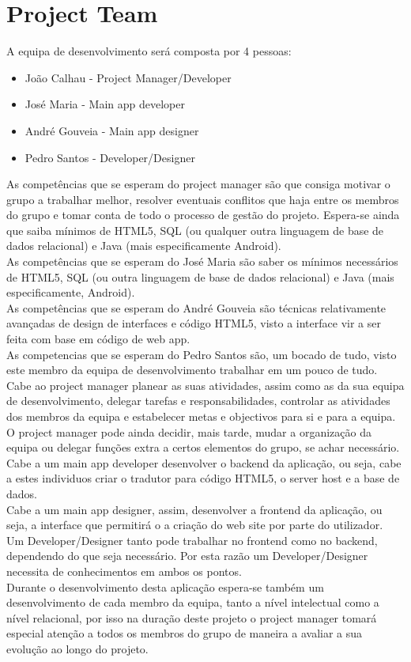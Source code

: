 \documentclass[a4paper]{article}
\begin{document}
\section{Project Team}

A equipa de desenvolvimento será composta por 4 pessoas:
\begin{itemize}
\item João Calhau - Project Manager/Developer
\item José Maria - Main app developer
\item André Gouveia - Main app designer
\item Pedro Santos - Developer/Designer
\end{itemize}

\noindent As competências que se esperam do project manager são que consiga motivar o grupo a trabalhar melhor, resolver eventuais conflitos que haja entre os membros do grupo e tomar conta de todo o processo de gestão do projeto. Espera-se ainda que saiba mínimos de HTML5, SQL (ou qualquer outra linguagem de base de dados relacional) e Java (mais especificamente Android). \\
\noindent As competências que se esperam do José Maria são saber os mínimos necessários de HTML5, SQL (ou outra linguagem de base de dados relacional) e Java (mais especificamente, Android). \\
\noindent As competências que se esperam do André Gouveia são técnicas relativamente avançadas de design de interfaces e código HTML5, visto a interface vir a ser feita com base em código de web app. \\
\noindent As competencias que se esperam do Pedro Santos são, um bocado de tudo, visto este membro da equipa de desenvolvimento trabalhar em um pouco de tudo. \\

\noindent Cabe ao project manager planear as suas atividades, assim como as da sua equipa de desenvolvimento, delegar tarefas e responsabilidades, controlar as atividades dos membros da equipa e estabelecer metas e objectivos para si e para a equipa. O project manager pode ainda decidir, mais tarde, mudar a organização da equipa ou delegar funções extra a certos elementos do grupo, se achar necessário. \\
Cabe a um main app developer desenvolver o backend da aplicação, ou seja, cabe a estes individuos criar o tradutor para código HTML5, o server host e a base de dados. \\
Cabe a um main app designer, assim, desenvolver a frontend da aplicação, ou seja, a interface que permitirá o a criação do web site por parte do utilizador. \\
Um Developer/Designer tanto pode trabalhar no frontend como no backend, dependendo do que seja necessário. Por esta razão um Developer/Designer necessita de conhecimentos em ambos os pontos. \\
Durante o desenvolvimento desta aplicação espera-se também um desenvolvimento de cada membro da equipa, tanto a nível intelectual como a nível relacional, por isso na duração deste projeto o project manager tomará especial atenção a todos os membros do grupo de maneira a avaliar a sua evolução ao longo do projeto.\\
\end{document}
